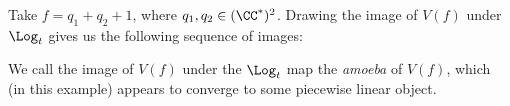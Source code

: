 

    Take $f=q_1+q_2+1$, where $q_1,q_2 \in (\CC^*)^2$. Drawing the image of $V(f)$ under $\Log_t$ gives us the following sequence of images:
\begin{figure}

\end{figure}
    We call the image of $V(f)$ under the $\Log_t$ map the \emph{amoeba} of $V(f)$, which (in this example) appears to converge to some piecewise linear object.

